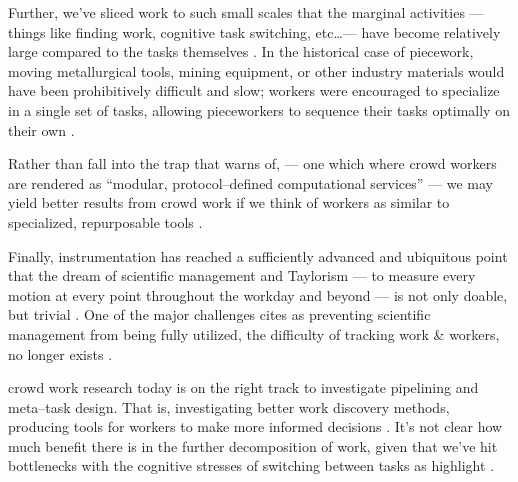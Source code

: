 \documentclass[trackingWork]{subfiles}
\begin{document}
Further, we've sliced work to such small scales that the marginal activities
--- things like finding work, cognitive task switching, etc\dots ---
have become relatively large compared to the tasks themselves
\cite{taskSearch}.
In the historical case of piecework,
moving metallurgical tools, mining equipment, or
other industry materials would have been prohibitively difficult and slow;
workers were encouraged to specialize in a single set of tasks,
allowing pieceworkers to sequence their tasks optimally on their own
\cite{hart2013rise}.

Rather than fall into the trap that \citeauthor{irani2015cultural} warns of,
--- one which where crowd workers are rendered as
``modular, protocol--defined computational services'' ---
we may yield better results from crowd work if we think of workers as similar to
specialized, repurposable tools
\cite{irani2015cultural}.
 
Finally, instrumentation has reached a sufficiently advanced and ubiquitous point that
the dream of scientific management and Taylorism
--- to measure every motion at every point throughout the workday and beyond ---
is not only doable, but trivial
\cite{waltz2012quantified}.
One of the major challenges \citeauthor{10.2307/23702539} cites as
preventing scientific management from being fully utilized,
the difficulty of tracking work \& workers, no longer exists
\cite{10.2307/23702539}.


\subsubsubsection{\implication}
crowd work research today is on the right track to investigate pipelining and meta--task design.
That is, investigating better work discovery methods, producing tools for workers to make more informed decisions
\cite[see, for example,][]{turkopticon}.
It's not clear how much benefit there is in the further decomposition of work,
given that we've hit bottlenecks with the cognitive stresses of switching between tasks
as \citeauthor{delayAndOrderLasecki} highlight
\cite{delayAndOrderLasecki}.


\onlyinsubfile{
  \balance{}
  \printbibliography
}
\end{document}
